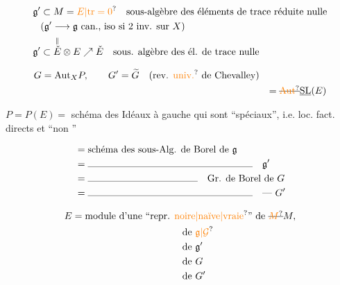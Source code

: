 \[ \begin{aligned}
 \mathfrak g'&\subset M=\unsure{E|\mathrm{tr}=0}\quad\text{sous-algèbre des éléments de trace réduite nulle}\\
 &(\mathfrak g'\longrightarrow\mathfrak g\ \text{can., iso si 2 inv. sur }X)\\
 \mathfrak g'&\subset\overset{\Vert}{\check E}\otimes E\nearrow\check E\quad\text{sous. algèbre des él. de trace nulle}
 \end{aligned} \]

\[ \begin{aligned}
 G&=\mathrm{Aut}_X P,\qquad G'=\widetilde G\quad(\text{rev. \unsure{univ.} de Chevalley})\\
 &&=\deleted{\unsure{\mathrm{Aut}}}\underline{\mathrm{SL}}(E)
 \end{aligned} \]


$P=P(E)={}$ schéma des Idéaux à gauche qui sont ``spéciaux'', i.e. loc. fact. directs et ``non \uline{}'' 

\[ \begin{aligned}
 &=\text{schéma des sous-Alg. de Borel de }\mathfrak g\\
 &=\rule{6cm}{0.3pt}\quad\mathfrak g'\\
 &=\rule{4cm}{0.3pt}\quad\text{Gr. de Borel de }G\\
 &=\rule{6cm}{0.3pt}\quad\text{--- }G'
 \end{aligned} \]



\[ \begin{aligned}
 E&=\text{module d'une ``repr. \unsure{noire|naïve|vraie}'' de }\deleted{\unsure{M}}M,\\
 &\hspace{4cm}\text{de }\unsure{\mathfrak g|\mathcal G}\\&\hspace{4cm}\text{de }\mathfrak g'\\
 &\hspace{4cm}\text{de }G\\&\hspace{4cm}\text{de }G'
 \end{aligned} \]

